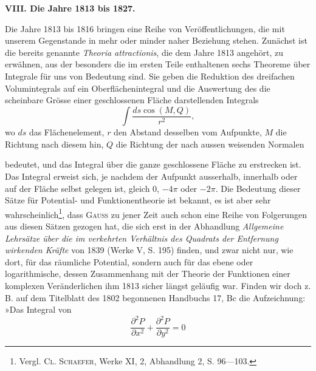 \par\bigskip
\begin{center}
\textbf{VIII. Die Jahre 1813 bis 1827.}\\[.8em]
\end{center}
\noindent\hspace*{\parindent}Die Jahre 1813 bis 1816 bringen eine Reihe von Veröffentlichungen, die
mit unserem Gegenstande in mehr oder minder naher Beziehung stehen. Zunächst
ist die bereits genannte \textit{Theoria attractionis}, die dem Jahre 1813 angehört,
zu erwähnen, aus der besonders die im ersten Teile enthaltenen sechs
Theoreme über Integrale für uns von Bedeutung sind. Sie geben die Reduktion
des dreifachen Volumintegrals auf ein Oberflächenintegral und die Auswertung
des die scheinbare Grösse einer geschlossenen Fläche darstellenden
Integrals
\begingroup\makeatletter\tagsleft@true\let\veqno\leqno\makeatother
\begin{equation*}
\int\frac{ds\cos(M,Q)}{r^2},\tag{*}
\end{equation*}
\endgroup
\noindent wo \(ds\) das Flächenelement, \(r\) den Abstand desselben vom Aufpunkte, \(M\) die
Richtung nach diesem hin, \(Q\) die Richtung der nach aussen weisenden Normalen\par
\HistoricalFoot{}{20\textsuperscript{*}}
\clearpage{}
\noindent bedeutet, und das Integral über die ganze geschlossene Fläche zu erstrecken
ist. Das Integral erweist sich, je nachdem der Aufpunkt ausserhalb,
innerhalb oder auf der Fläche selbst gelegen ist, gleich \(0\), \(-4\pi\) oder \(-2\pi\).
Die Bedeutung dieser Sätze für Potential- und Funktionentheorie ist bekannt,
es ist aber sehr wahrscheinlich\footnote{Vergl. \textsc{Cl. Schaefer}, Werke XI, 2, Abhandlung 2, S. 96—103.}, dass \textsc{Gauss} zu jener Zeit auch schon eine
Reihe von Folgerungen aus diesen Sätzen gezogen hat, die sich erst in der
Abhandlung \textit{Allgemeine Lehrsätze über die im verkehrten Verhältnis des Quadrats
der Entfernung wirkenden Kräfte} von 1839 (Werke V, S. 195) finden, und zwar
nicht nur, wie dort, für das räumliche Potential, sondern auch für das ebene
oder logarithmische, dessen Zusammenhang mit der Theorie der Funktionen
einer komplexen Veränderlichen ihm 1813 sicher längst geläufig war. Finden
wir doch z. B. auf dem Titelblatt des 1802 begonnenen Handbuchs 17, Bc
die Aufzeichnung: »Das Integral von
\[
\frac{\partial^2P}{\partial x^2}+\frac{\partial^2P}{\partial y^2}=0
\]
